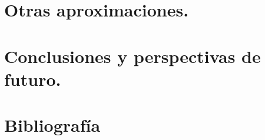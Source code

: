 \documentclass[11pt,a4paper,titlepage]{article}
\begin{document}
%
%
%
%
\section{Otras aproximaciones.} %

%
%
%
%
\section{Conclusiones y perspectivas de futuro.} %

%
%
%
%
\section{Bibliografía}


\nocite{*}
\end{document}
